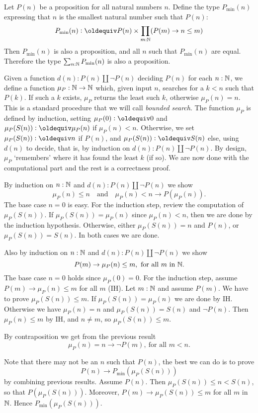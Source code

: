 \begin{definition}
\label{def:Nwellordered}
Let $P(n)$ be a proposition for all natural numbers $n$. 
Define the type $P_{\min}(n)$ expressing that $n$ is the smallest
natural number such that $P(n)$:
\[
P_{\min}(n) \defeq P(n) \times \prod_{m:\NN} (P(m) \to n\leq m)
\]
Then $P_{\min}(n)$ is also a proposition, and all $n$ such that $P_{\min}(n)$
are equal. Therefore the type $\sum_{n:\mathbb{N}} P_{\min}(n)$
is also a proposition. 

Given a function $d(n): P(n)\amalg\neg P(n)$ deciding $P(n)$ for each $n:\mathbb{N}$, 
we define a function $\mu_P:\mathbb{N}\to\mathbb{N}$ which,
given input $n$, searches for a $k<n$ such that $P(k)$.
If such a $k$ exists, $\mu_P$ returns the least such $k$,
otherwise $\mu_P(n)=n$.
This is a standard procedure that we will call \emph{bounded search}.
The function $\mu_P$ is defined by induction, setting
$\mu_P(0)\defeq 0$ and 
$\mu_P(S(n))\defeq \mu_P(n)$ if $\mu_P(n) < n$.
Otherwise, we set $\mu_P(S(n))\defeq n$ if $P(n)$,
and $\mu_P(S(n))\defeq S(n)$ else, using $d(n)$ to decide,
that is, by induction on $d(n):P(n)\amalg\neg P(n)$.
By design, $\mu_P$ `remembers' where it has found the least $k$ (if so).
We are now done with the computational part and the rest
is a correctness proof.

By induction on $n:\mathbb{N}$ and $d(n): P(n)\amalg\neg P(n)$ we show
\[
\mu_P(n)\leq n \quad\text{and}\quad \mu_P(n)<n \to P(\mu_P(n)).
\]
The base case $n=0$ is easy. For the induction step, 
review the computation of $\mu_P(S(n))$. If $\mu_P(S(n))=\mu_P(n)$
since $\mu_P(n) < n$, then we are done by the induction hypothesis.
Otherwise, either $\mu_P(S(n))=n$ and $P(n)$, or $\mu_P(S(n))=S(n)$.
In both cases we are done.

Also by induction on $n:\mathbb{N}$ and $d(n): P(n)\amalg\neg P(n)$ we show
\[
P(m) \to \mu_P(n)\leq m,~ \text{for all $m$ in $\mathbb{N}$.}
\]
The base case $n=0$ holds since $\mu_P(0)=0$. For the induction step,
assume $P(m) \to \mu_P(n)\leq m$ for all $m$ (IH). Let $m:\mathbb{N}$
and assume $P(m)$. We have to prove $\mu_P(S(n))\leq m$.
If $\mu_P(S(n))=\mu_P(n)$ we are done by IH. Otherwise we have
$\mu_P(n)=n$ and $\mu_P(S(n)) = S(n)$ and $\neg P(n)$. 
Then $\mu_P(n)\leq m$ by IH, and $n\neq m$, so $\mu_P(S(n))\leq m$.

By contraposition we get from the previous result
\[
\mu_P(n)= n \to \neg P(m),~\text{for all $m<n$.}
\]

Note that there may not be an $n$ such that $P(n)$,
the best we can do is to prove
\[
P(n)\to P_{\min}(\mu_P(S(n)))
\]
by combining previous results. Assume $P(n)$.
Then $\mu_P(S(n))\leq n < S(n)$, so that $P(\mu_P(S(n)))$.
Moreover, $P(m) \to \mu_P(S(n))\leq m$ for all $m$ in $\mathbb{N}$.
Hence $P_{\min}(\mu_P(S(n)))$.


\end{definition}
